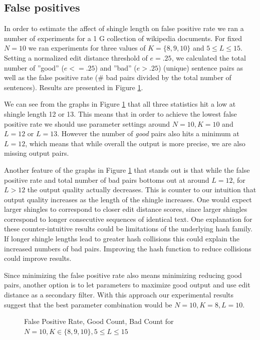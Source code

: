 \documentclass{acm_proc_article-sp}
\begin{document}
\subsection{False positives}

In order to estimate the affect of shingle length on false positive rate we ran a number of experiments for a 1 G collection of wikipedia documents. For fixed $N=10$ we ran experiments for three values of $K=\{8,9,10\}$ and $5 \le L \le 15$. Setting a normalized edit distance threshold of $e = .25$, we calculated the total number of ''good'' ($e <= .25$) and ''bad'' ($e > .25$) (unique) sentence pairs as well as the false positive rate (\# bad pairs divided by the total number of sentences). Results are presented in Figure \ref{ed-grid}.

We can see from the graphs in Figure \ref{ed-grid} that all three statistics hit a low at shingle length 12 or 13. This means that in order to achieve the lowest false positive rate we should use parameter settings around $N=10, K=10$ and $L=12$ or $L=13$. However the number of \emph{good} pairs also hits a minimum at $L = 12$, which means that while overall the output is more precise, we are also missing output pairs.

Another feature of the graphs in Figure \ref{ed-grid} that stands out is that while the false positive rate and total number of bad pairs bottoms out at around $L=12$, for $L > 12$ the output quality actually decreases. This is counter to our intuition that output quality increases as the length of the shingle increases. One would expect larger shingles to correspond to closer edit distance scores, since larger shingles correspond to longer consecutive sequences of identical text. One explanation for these counter-intuitive results could be limitations of the underlying hash family. If longer shingle lengths lead to greater hash collisions this could explain the increased numbers of bad pairs. Improving the hash function to reduce collisions could improve results.

Since minimizing the false positive rate also means minimizing reducing good pairs, another option is to let parameters to maximize good output and use edit distance as a secondary filter. With this approach our experimental results suggest that the best parameter combination would be $N=10, K=8, L=10$.

\begin{figure}
\centering
{}
\caption{False Positive Rate, Good Count, Bad Count for $N=10, K \in \{8,9,10\}, 5 \le L \le 15$}
\label{ed-grid}
\end{figure}
\end{document}
